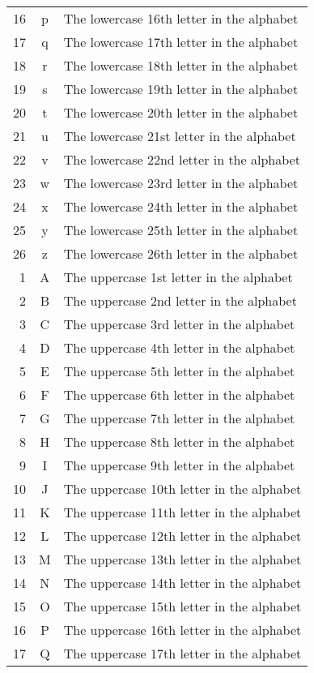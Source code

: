 \begin{longtable}{rcl}
  16 & p & The lowercase 16th letter in the alphabet\\
  17 & q & The lowercase 17th letter in the alphabet\\
  18 & r & The lowercase 18th letter in the alphabet\\
  19 & s & The lowercase 19th letter in the alphabet\\
  20 & t & The lowercase 20th letter in the alphabet\\
  21 & u & The lowercase 21st letter in the alphabet\\
  22 & v & The lowercase 22nd letter in the alphabet\\
  23 & w & The lowercase 23rd letter in the alphabet\\
  24 & x & The lowercase 24th letter in the alphabet\\
  25 & y & The lowercase 25th letter in the alphabet\\
  26 & z & The lowercase 26th letter in the alphabet\\
   1 & A & The uppercase 1st letter in the alphabet\\
   2 & B & The uppercase 2nd letter in the alphabet\\
   3 & C & The uppercase 3rd letter in the alphabet\\
   4 & D & The uppercase 4th letter in the alphabet\\
   5 & E & The uppercase 5th letter in the alphabet\\
   6 & F & The uppercase 6th letter in the alphabet\\
   7 & G & The uppercase 7th letter in the alphabet\\
   8 & H & The uppercase 8th letter in the alphabet\\
   9 & I & The uppercase 9th letter in the alphabet\\
  10 & J & The uppercase 10th letter in the alphabet\\
  11 & K & The uppercase 11th letter in the alphabet\\
  12 & L & The uppercase 12th letter in the alphabet\\
  13 & M & The uppercase 13th letter in the alphabet\\
  14 & N & The uppercase 14th letter in the alphabet\\
  15 & O & The uppercase 15th letter in the alphabet\\
  16 & P & The uppercase 16th letter in the alphabet\\
  17 & Q & The uppercase 17th letter in the alphabet\\

\end{longtable}
